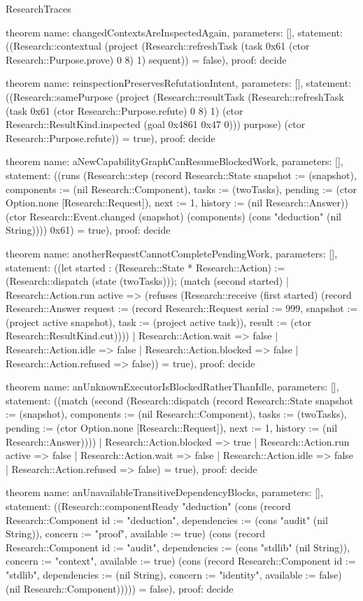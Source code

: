 \begin{lexlean}{ResearchTraces}
\begin{semanticmodule}
theorem{
  name: changedContextsAreInspectedAgain,
  parameters: [],
  statement: ((Research::contextual (project (Research::refreshTask (task 0x61 (ctor Research::Purpose.prove) 0 8) 1) sequent)) = false),
  proof: decide{}
}

theorem{
  name: reinspectionPreservesRefutationIntent,
  parameters: [],
  statement: ((Research::samePurpose (project (Research::resultTask (Research::refreshTask (task 0x61 (ctor Research::Purpose.refute) 0 8) 1) (ctor Research::ResultKind.inspected (goal 0x4861 0x47 0))) purpose) (ctor Research::Purpose.refute)) = true),
  proof: decide{}
}

theorem{
  name: aNewCapabilityGraphCanResumeBlockedWork,
  parameters: [],
  statement: ((runs (Research::step (record Research::State {snapshot := (snapshot), components := (nil Research::Component), tasks := (twoTasks), pending := (ctor Option.none [Research::Request]), next := 1, history := (nil Research::Answer)}) (ctor Research::Event.changed (snapshot) (components) (cons "deduction" (nil String)))) 0x61) = true),
  proof: decide{}
}

theorem{
  name: anotherRequestCannotCompletePendingWork,
  parameters: [],
  statement: ((let started : (Research::State * Research::Action) := (Research::dispatch (state (twoTasks))); (match (second started)
    | Research::Action.run active => (refuses (Research::receive (first started) (record Research::Answer {request := (record Research::Request {serial := 999, snapshot := (project active snapshot), task := (project active task)}), result := (ctor Research::ResultKind.cut)})))
    | Research::Action.wait => false
    | Research::Action.idle => false
    | Research::Action.blocked => false
    | Research::Action.refused => false)) = true),
  proof: decide{}
}

theorem{
  name: anUnknownExecutorIsBlockedRatherThanIdle,
  parameters: [],
  statement: ((match (second (Research::dispatch (record Research::State {snapshot := (snapshot), components := (nil Research::Component), tasks := (twoTasks), pending := (ctor Option.none [Research::Request]), next := 1, history := (nil Research::Answer)})))
    | Research::Action.blocked => true
    | Research::Action.run active => false
    | Research::Action.wait => false
    | Research::Action.idle => false
    | Research::Action.refused => false) = true),
  proof: decide{}
}

theorem{
  name: anUnavailableTransitiveDependencyBlocks,
  parameters: [],
  statement: ((Research::componentReady "deduction" (cons (record Research::Component {id := "deduction", dependencies := (cons "audit" (nil String)), concern := "proof", available := true}) (cons (record Research::Component {id := "audit", dependencies := (cons "stdlib" (nil String)), concern := "context", available := true}) (cons (record Research::Component {id := "stdlib", dependencies := (nil String), concern := "identity", available := false}) (nil Research::Component))))) = false),
  proof: decide{}
}


\end{semanticmodule}
\end{lexlean}
